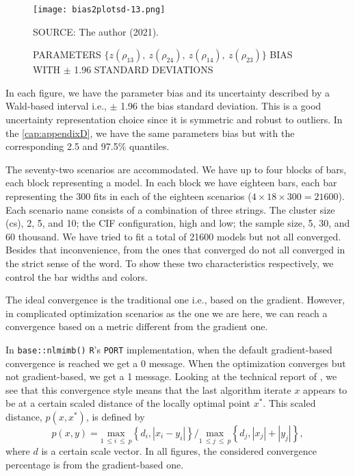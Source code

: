 \begin{figure}[H]
 \setlength{\abovecaptionskip}{.0001pt}
 \caption{PARAMETERS
          \(\{z(\rho_{13}),~z(\rho_{24}),~z(\rho_{14}),~z(\rho_{23})\}\)
          BIAS WITH \(\pm\) 1.96 STANDARD DEVIATIONS}
 \vspace{0.2cm}\centering
 \texttt{[image: bias2plotsd-13.png]}\\
 \begin{footnotesize}
  SOURCE: The author (2021).
 \end{footnotesize}
 \label{fig:biassdrhoz4}
\end{figure}

In each figure, we have the parameter bias and its uncertainty described
by a Wald-based interval i.e., \(\pm\) 1.96 the bias standard
deviation. This is a good uncertainty representation choice since it is
symmetric and robust to outliers. In the \autoref{cap:appendixD}, we
have the same parameters bias but with the corresponding 2.5 and 97.5\%
quantiles.

The seventy-two scenarios are accommodated. We have up to four blocks of
bars, each block representing a model. In each block we have eighteen
bars, each bar representing the 300 fits in each of the eighteen
scenarios (\(4 \times 18 \times 300 = 21600\)). Each scenario name
consists of a combination of three strings. The cluster size (cs), 2, 5,
and 10; the CIF configuration, high and low; the sample size, 5, 30, and
60 thousand. We have tried to fit a total of 21600 models but not all
converged. Besides that inconvenience, from the ones that converged do
not all converged in the strict sense of the word. To show these two
characteristics respectively, we control the bar widths and colors.

The ideal convergence is the traditional one i.e., based on the
gradient. However, in complicated optimization scenarios as the one we
are here, we can reach a convergence based on a metric different from
the gradient one.

In \texttt{base::nlmimb()} \texttt{R}'s \texttt{PORT} implementation,
when the default gradient-based convergence is reached we get a 0
message. When the optimization converges but not gradient-based, we get
a 1 message. Looking at the technical report of ,
we see that this convergence style means that the last algorithm iterate
\(x\) appears to be at a certain scaled distance of the locally optimal
point \(x^{\ast}\). This scaled distance, \(p(x, x^{\ast})\), is defined
by
\[
 p(x, y) =
 \underset{1~\leq i~\leq~p}{\text{max}}
 \left\{d_{i}, |x_{i} - y_{i}|\right\}
 \Big/
 \underset{1~\leq j~\leq~p}{\text{max}}
 \left\{d_{j}, |x_{j}| + |y_{j}|\right\},
\]
where \(d\) is a certain scale vector. In all figures, the considered
convergence percentage is from the gradient-based one.

